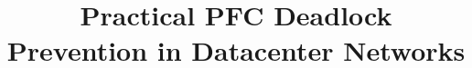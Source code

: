 \documentclass[letterpaper, twocolumn,fleqn]{sig-alternate-10pt}
\begin{document}

\title{Practical PFC Deadlock Prevention in Datacenter Networks}
\maketitle

%



%




%
%




	
	
%
\end{document}
